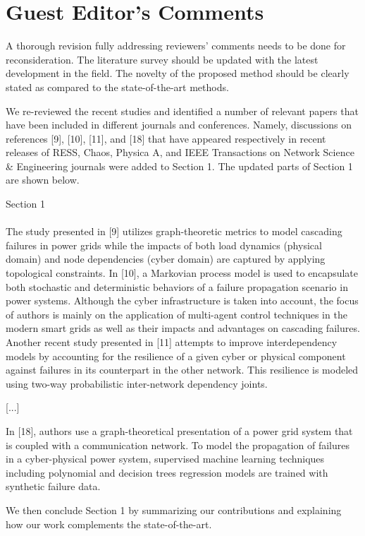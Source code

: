 \documentclass{article}
\newenvironment{response}{
  \doublespacing
  \setlength\parindent{0.05\linewidth}
  \ttfamily
}{}
\newenvironment{textblock}[1]
{\begin{tcolorbox}[breakable,enhanced]{#1 \\ \\}}
{\end{tcolorbox}}
\begin{document}
\section{Guest Editor's Comments}
\label{sec:editor}
A thorough revision fully addressing reviewers' comments needs to be done for reconsideration. The literature survey should be updated with the latest development in the field. The novelty of the proposed method should be clearly stated as compared to the state-of-the-art methods.

\begin{response}
We re-reviewed the recent studies and identified a number of relevant papers that have been included in different journals and conferences. Namely, discussions on references [9], [10], [11], and [18] that have appeared respectively in recent releases of RESS, Chaos, Physica A, and IEEE Transactions on Network Science \& Engineering journals were added to Section 1. The updated parts of Section 1 are shown below.

\begin{textblock}{Section 1}
The study presented in [9] utilizes graph-theoretic metrics to model cascading failures in power grids while the impacts of both load dynamics (physical domain) and node dependencies (cyber domain) are captured by applying topological constraints. In [10], a Markovian process model is used to encapsulate both stochastic and deterministic behaviors of a failure propagation scenario in power systems. Although the cyber infrastructure is taken into account, the focus of authors is mainly on the application of multi-agent control techniques in the modern smart grids as well as their impacts and advantages on cascading failures. Another recent study presented in [11] attempts to improve interdependency models by accounting for the resilience of a given cyber or physical component against failures in its counterpart in the other network. This resilience is modeled using two-way probabilistic inter-network dependency joints.

[...]

In [18], authors use a graph-theoretical presentation of a power grid system that is coupled with a communication network. To model the propagation of failures in a cyber-physical power system, supervised machine learning techniques including polynomial and decision trees regression models are trained with synthetic failure data.
\end{textblock}

 We then conclude Section 1 by summarizing our contributions and explaining how our work complements the state-of-the-art.


\end{response}
\end{document}
